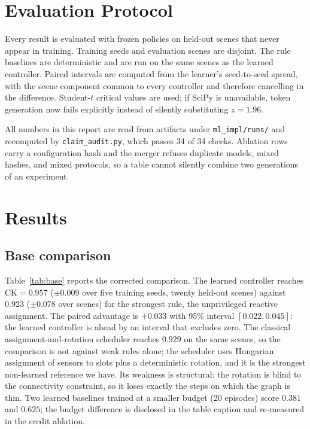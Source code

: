 \documentclass[conference]{IEEEtran}
\newcommand{\ck}{\mathrm{CK}}
\begin{document}
\section{Evaluation Protocol}
Every result is evaluated with frozen policies on held-out scenes that never appear in training. Training seeds and evaluation scenes are disjoint. The rule baselines are deterministic and are run on the same scenes as the learned controller. Paired intervals are computed from the learner's seed-to-seed spread, with the scene component common to every controller and therefore cancelling in the difference. Student-$t$ critical values are used; if SciPy is unavailable, token generation now fails explicitly instead of silently substituting $z=1.96$.

All numbers in this report are read from artifacts under \texttt{ml\_impl/runs/} and recomputed by \texttt{claim\_audit.py}, which passes 34 of 34 checks. Ablation rows carry a configuration hash and the merger refuses duplicate models, mixed hashes, and mixed protocols, so a table cannot silently combine two generations of an experiment.

\section{Results}
\subsection{Base comparison}
Table~\ref{tab:base} reports the corrected comparison. The learned controller reaches $\ck=0.957$ ($\pm0.009$ over five training seeds, twenty held-out scenes) against $0.923$ ($\pm0.078$ over scenes) for the strongest rule, the unprivileged reactive assignment. The paired advantage is $+0.033$ with 95\% interval $[0.022,0.045]$: the learned controller is ahead by an interval that excludes zero. The classical assignment-and-rotation scheduler reaches $0.929$ on the same scenes, so the comparison is not against weak rules alone; the scheduler uses Hungarian assignment of sensors to slots plus a deterministic rotation, and it is the strongest non-learned reference we have. Its weakness is structural: the rotation is blind to the connectivity constraint, so it loses exactly the steps on which the graph is thin. Two learned baselines trained at a smaller budget (20 episodes) score $0.381$ and $0.625$; the budget difference is disclosed in the table caption and re-measured in the credit ablation.
\end{document}
